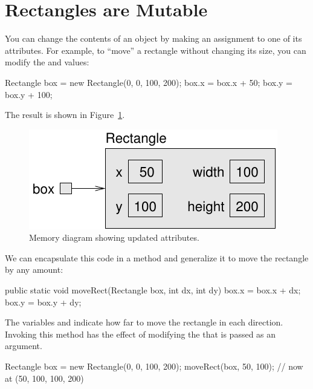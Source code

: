 \section{Rectangles are Mutable}


You can change the contents of an object by making an assignment to one of its attributes.
For example, to ``move'' a rectangle without changing its size, you can modify the  and  values:

\begin{code}
Rectangle box = new Rectangle(0, 0, 100, 200);
box.x = box.x + 50;
box.y = box.y + 100;
\end{code}

The result is shown in Figure~\ref{fig.rectangle2}.

\begin{figure}[!ht]
\begin{center}
\includegraphics{figs/rectangle2.pdf}
\caption{Memory diagram showing updated attributes.}
\label{fig.rectangle2}
\end{center}
\end{figure}


We can encapsulate this code in a method and generalize it to move the rectangle by any amount:

\begin{code}
public static void moveRect(Rectangle box, int dx, int dy) {
    box.x = box.x + dx;
    box.y = box.y + dy;
}
\end{code}

The variables  and  indicate how far to move the rectangle in each direction.
Invoking this method has the effect of modifying the  that is passed as an argument.

\begin{code}
Rectangle box = new Rectangle(0, 0, 100, 200);
moveRect(box, 50, 100);  // now at (50, 100, 100, 200)
\end{code}


